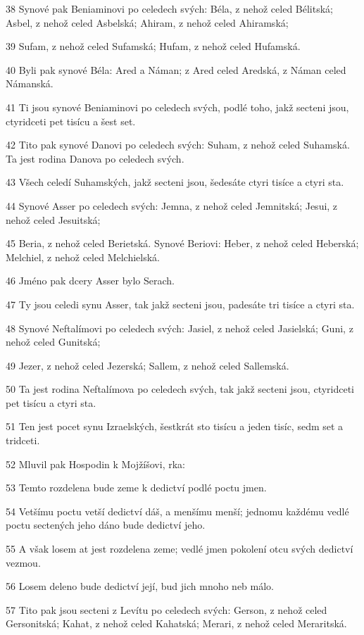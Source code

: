 \par 38 Synové pak Beniaminovi po celedech svých: Béla, z nehož celed Bélitská; Asbel, z nehož celed Asbelská; Ahiram, z nehož celed Ahiramská;
\par 39 Sufam, z nehož celed Sufamská; Hufam, z nehož celed Hufamská.
\par 40 Byli pak synové Béla: Ared a Náman; z Ared celed Aredská, z Náman celed Námanská.
\par 41 Ti jsou synové Beniaminovi po celedech svých, podlé toho, jakž secteni jsou, ctyridceti pet tisícu a šest set.
\par 42 Tito pak synové Danovi po celedech svých: Suham, z nehož celed Suhamská. Ta jest rodina Danova po celedech svých.
\par 43 Všech celedí Suhamských, jakž secteni jsou, šedesáte ctyri tisíce a ctyri sta.
\par 44 Synové Asser po celedech svých: Jemna, z nehož celed Jemnitská; Jesui, z nehož celed Jesuitská;
\par 45 Beria, z nehož celed Berietská. Synové Beriovi: Heber, z nehož celed Heberská; Melchiel, z nehož celed Melchielská.
\par 46 Jméno pak dcery Asser bylo Serach.
\par 47 Ty jsou celedi synu Asser, tak jakž secteni jsou, padesáte tri tisíce a ctyri sta.
\par 48 Synové Neftalímovi po celedech svých: Jasiel, z nehož celed Jasielská; Guni, z nehož celed Gunitská;
\par 49 Jezer, z nehož celed Jezerská; Sallem, z nehož celed Sallemská.
\par 50 Ta jest rodina Neftalímova po celedech svých, tak jakž secteni jsou, ctyridceti pet tisícu a ctyri sta.
\par 51 Ten jest pocet synu Izraelských, šestkrát sto tisícu a jeden tisíc, sedm set a tridceti.
\par 52 Mluvil pak Hospodin k Mojžíšovi, rka:
\par 53 Temto rozdelena bude zeme k dedictví podlé poctu jmen.
\par 54 Vetšímu poctu vetší dedictví dáš, a menšímu menší; jednomu každému vedlé poctu sectených jeho dáno bude dedictví jeho.
\par 55 A však losem at jest rozdelena zeme; vedlé jmen pokolení otcu svých dedictví vezmou.
\par 56 Losem deleno bude dedictví její, bud jich mnoho neb málo.
\par 57 Tito pak jsou secteni z Levítu po celedech svých: Gerson, z nehož celed Gersonitská; Kahat, z nehož celed Kahatská; Merari, z nehož celed Meraritská.
